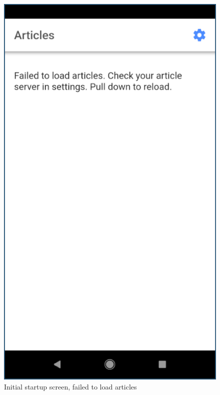 \documentclass[12pt]{report}
\begin{document}
\begin{figure}
    \centering
    \includegraphics[scale=0.5]{images/avd-no-articles.png}
    \caption{Initial startup screen, failed to load articles}
    \label{fig:avd-no-articles}
\end{figure}
\end{document}
